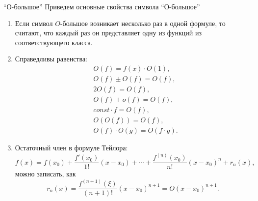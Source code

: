 \documentclass[8pt]{beamer}
\begin{document}

\begin{frame}{``О-большое''}
Приведем основные свойства символа ``О-большое''
\begin{enumerate}
\item Если символ $O$-большое возникает несколько раз в одной формуле, то считают, что каждый раз он представляет одну из функций из соответствующего класса.
\item Справедливы равенства:
\begin{align*}
&O(f) = f(x)\cdot O(1),\\
&O(f) \pm O(f) = O(f),\\
&2 O(f) = O(f),\\
&O(f)+o(f) = O(f),\\
&const \cdot f= O(f),\\
&O(O(f)) = O(f),\\
&O(f)\cdot O(g) = O(f\cdot g).
\end{align*}
\item Остаточный член в формуле Тейлора:
$$f(x) = f(x_0) + \frac{f'(x_0)}{1!}(x-x_0)+\cdots+\frac{f^{(n)}(x_0)}{n!}(x-x_0)^n+r_{n}(x),$$
можно записать, как
$$r_n(x) = \frac{f^{(n+1)}(\xi)}{(n+1)!}(x-x_0)^{n+1} = O(x-x_0)^{n+1}.$$
\end{enumerate}
\end{frame}
\end{document}
